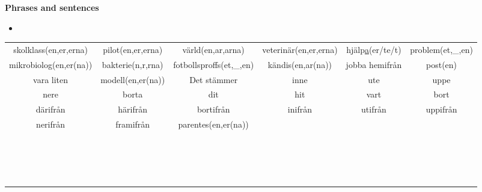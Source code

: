 
\begin{flushleft}
    \textbf{Phrases and sentences}
    \begin{itemize}
        \item 
    \end{itemize}
\end{flushleft}

\begin{center}
    \begin{adjustwidth}{-2.65cm}{}
        \begin{tabular}{|c c c c c c|}
            \hline
            skolklass(en,er,erna) & pilot(en,er,erna) & värld(en,ar,arna) & veterinär(en,er,erna) & hjälp\underline{a}(er/te/t) & problem(et,\_,en) \\
            mikrobiolog(en,er(na)) & bakterie(n,r,rna) & fotbollsproffs(et,\_,en) & kändis(en,ar(na)) & jobba hemifrån & post(en) \\
            vara liten & modell(en,er(na)) & Det stämmer & inne & ute & uppe \\
            nere & borta & dit & hit & vart & bort \\
            därifrån & härifrån & bortifrån & inifrån & utifrån & uppifrån \\
            nerifrån & framifrån & parentes(en,er(na)) &  &  &  \\
             &  &  &  &  &  \\
             &  &  &  &  &  \\
             &  &  &  &  &  \\
             &  &  &  &  &  \\
             &  &  &  &  &  \\
             &  &  &  &  &  \\
             &  &  &  &  &  \\
             &  &  &  &  &  \\
             &  &  &  &  &  \\
             &  &  &  &  &  \\
             &  &  &  &  &  \\
             &  &  &  &  &  \\
             &  &  &  &  &  \\
             &  &  &  &  &  \\
             &  &  &  &  &  \\
             &  &  &  &  &  \\
             &  &  &  &  &  \\
            \hline
        \end{tabular}
    \end{adjustwidth}
\end{center}


